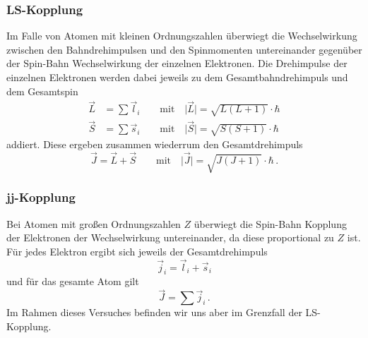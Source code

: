         \subsubsection{LS-Kopplung}
            Im Falle von Atomen mit kleinen Ordnungszahlen überwiegt die Wechselwirkung zwischen
            den Bahndrehimpulsen und den Spinmomenten untereinander gegenüber der Spin-Bahn Wechselwirkung der einzelnen Elektronen.
            Die Drehimpulse der einzelnen Elektronen werden dabei jeweils zu dem Gesamtbahndrehimpuls und dem Gesamtspin
            \begin{align}
                \vec{L}&=\sum\vec{l}_i \qquad\text{mit}\quad \vert\vec{L}\vert=\sqrt{L(L+1)}\cdot\hbar \\
                \vec{S}&=\sum\vec{s}_i \qquad\text{mit}\quad \vert\vec{S}\vert=\sqrt{S(S+1)}\cdot\hbar
            \end{align}
            addiert.
            Diese ergeben zusammen wiederrum den Gesamtdrehimpuls
            \begin{equation}
                \vec{J}=\vec{L}+\vec{S} \qquad\text{mit}\quad \vert\vec{J}\vert=\sqrt{J(J+1)}\cdot\hbar \, .
            \end{equation}
        \subsubsection{jj-Kopplung}
            Bei Atomen mit großen Ordnungszahlen $Z$ überwiegt die Spin-Bahn Kopplung der Elektronen der Wechselwirkung untereinander,
            da diese proportional zu $Z$ ist.
            Für jedes Elektron ergibt sich jeweils der Gesamtdrehimpuls
            \begin{equation}
                \vec{j}_i=\vec{l}_i+\vec{s}_i 
            \end{equation}
            und für das gesamte Atom gilt
            \begin{equation}
                \vec{J}=\sum\vec{j}_i \, .
            \end{equation}
        Im Rahmen dieses Versuches befinden wir uns aber im Grenzfall der LS-Kopplung.
